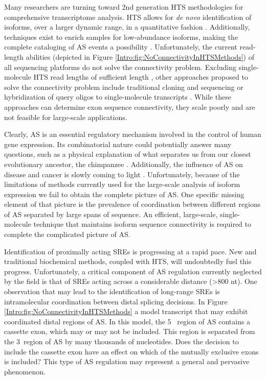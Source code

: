     Many researchers are turning toward 2nd generation HTS methodologies for comprehensive transcriptome analysis. HTS allows for \textit{de novo} identification of isoforms, over a larger dynamic range, in a quantitative fashion \citep{Mortazavi2008}. Additionally, techniques exist to enrich samples for low-abundance isoforms, making the complete cataloging of AS events a possibility \citep{Djebali2008, Salehi-Ashtiani2008}. Unfortunately, the current read-length abilities (depicted in Figure \ref{Intro:fig:NoConnectivityInHTSMethods}) of all sequencing platforms do not solve the connectivity problem. Excluding single-molecule HTS read lengths of sufficient length \citep{Shendure2004}, other approaches proposed to solve the connectivity problem include traditional cloning and sequencing or hybridization of query oligos to single-molecule transcripts \citep{Zhu2003, Calarco2007, Emerick2007}. While these approaches can determine exon sequence connectivity, they scale poorly and are not feasible for large-scale applications. 

    Clearly, AS is an essential regulatory mechanism involved in the control of human gene expression. Its combinatorial nature could potentially answer many questions, such as a physical explanation of what separates us from our closest evolutionary ancestor, the chimpanzee \citep{Calarco2007a}. Additionally, the influence of AS on disease and cancer is slowly coming to light \citep{Tazi2009}. Unfortunately, because of the limitations of methods currently used for the large-scale analysis of isoform expression we fail to obtain the complete picture of AS. One specific missing element of that picture is the prevalence of coordination between different regions of AS separated by large spans of sequence. An efficient, large-scale, single-molecule technique that maintains isoform sequence connectivity is required to complete the complicated picture of AS.

    Identification of proximally acting SREs is progressing at a rapid pace. New and traditional biochemical methods, coupled with HTS, will undoubtedly fuel this progress. Unfortunately, a critical component of AS regulation currently neglected by the field is that of SREs acting across a considerable distance (>800 nt). One observation that may lead to the identification of long-range SREs is intramolecular coordination between distal splicing decisions. In Figure \ref{Intro:fig:NoConnectivityInHTSMethods} a model transcript that may exhibit coordinated distal regions of AS. In this model, the 5\textprime~ region of AS contains a cassette exon, which may or may not be included. This region is separated from the 3\textprime~region of AS by many thousands of nucleotides. Does the decision to include the cassette exon have an effect on which of the mutually exclusive exons is included? This type of AS regulation may represent a general and pervasive phenomenon.

